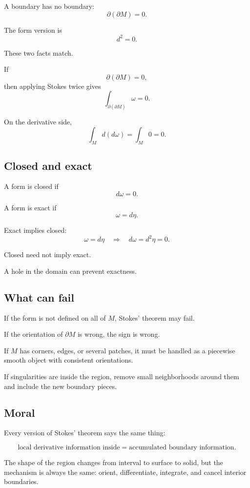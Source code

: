A boundary has no boundary:
\[
\boxed{
    \partial(\partial M)=0.
}
\]

The form version is
\[
\boxed{
    d^2=0.
}
\]

These two facts match.

If
\[
    \partial(\partial M)=0,
\]
then applying Stokes twice gives
\[
    \int_{\partial(\partial M)}\omega=0.
\]

On the derivative side,
\[
    \int_M d(d\omega)=\int_M 0=0.
\]

\subsection*{Closed and exact}

A form is closed if
\[
\boxed{
    d\omega=0.
}
\]

A form is exact if
\[
\boxed{
    \omega=d\eta.
}
\]

Exact implies closed:
\[
\boxed{
    \omega=d\eta
    \quad\Longrightarrow\quad
    d\omega=d^2\eta=0.
}
\]

Closed need not imply exact.

A hole in the domain can prevent exactness.

\subsection*{What can fail}

If the form is not defined on all of \(M\), Stokes' theorem may fail.

If the orientation of \(\partial M\) is wrong, the sign is wrong.

If \(M\) has corners, edges, or several patches, it must be handled as a piecewise
smooth object with consistent orientations.

If singularities are inside the region, remove small neighborhoods around them and
include the new boundary pieces.

\subsection*{Moral}

Every version of Stokes' theorem says the same thing:

\[
\boxed{
    \text{local derivative information inside}
    =
    \text{accumulated boundary information}.
}
\]

The shape of the region changes from interval to surface to solid, but the mechanism is
always the same: orient, differentiate, integrate, and cancel interior boundaries.

